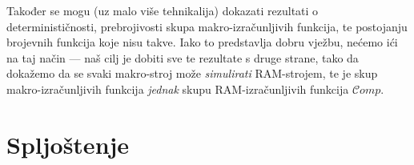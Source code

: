 Također se mogu (uz malo više tehnikalija) dokazati rezultati o determinističnosti, prebrojivosti skupa makro-izračunljivih funkcija, te postojanju brojevnih funkcija koje nisu takve. Iako to predstavlja dobru vježbu, nećemo ići na taj način --- naš cilj je dobiti sve te rezultate s druge strane, tako da dokažemo da se svaki makro-stroj može \emph{simulirati} RAM-strojem, te je skup makro-izračunljivih funkcija \emph{jednak} skupu RAM-izračunljivih funkcija $\mathcal Comp$.





\section{Spljoštenje}

